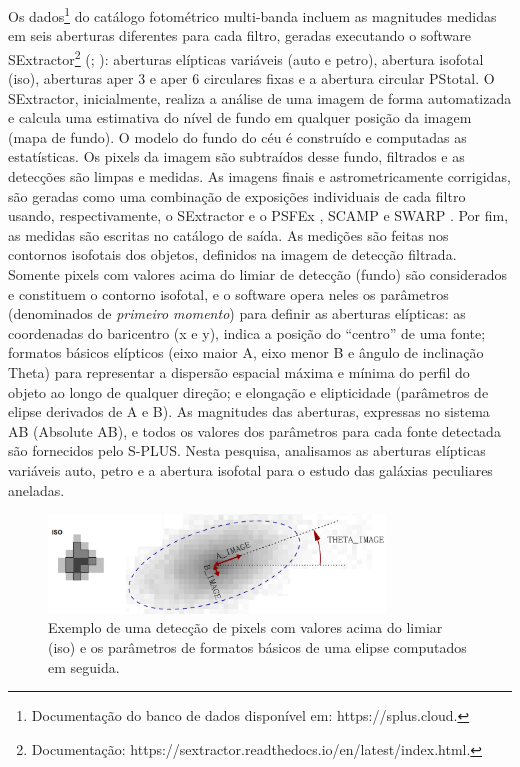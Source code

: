 Os dados\footnote{Documentação do banco de dados disponível em: https://splus.cloud.} do catálogo fotométrico multi-banda incluem as magnitudes medidas em seis aberturas diferentes para cada filtro, geradas executando o software SExtractor\footnote{Documentação: https://sextractor.readthedocs.io/en/latest/index.html.} (; ): aberturas elípticas variáveis (auto e petro), abertura isofotal (iso), aberturas aper 3 e aper 6 circulares fixas e a abertura circular PStotal. O SExtractor, inicialmente, realiza a análise de uma imagem de forma automatizada e calcula uma estimativa do nível de fundo em qualquer posição da imagem (mapa de fundo). O modelo do fundo do céu é construído e computadas as estatísticas. Os pixels da imagem são subtraídos desse fundo, filtrados e as detecções são limpas e medidas. As imagens finais e astrometricamente corrigidas, são geradas como uma combinação de exposições individuais de cada filtro usando, respectivamente, o SExtractor \cite{2010ascl.soft10064B} e o PSFEx \cite{2013ascl.soft01001B}, SCAMP \cite{2010ascl.soft10063B} e SWARP \cite{2010ascl.soft10068B}. Por fim, as medidas são escritas no catálogo de saída. As medições são feitas nos contornos isofotais dos objetos, definidos na imagem de detecção filtrada. Somente pixels com valores acima do limiar de detecção (fundo) são considerados e constituem o contorno isofotal, e o software opera neles os parâmetros (denominados de \emph{primeiro momento}) para definir as aberturas elípticas: as coordenadas do baricentro (x e y), indica a posição do ``centro'' de uma fonte; formatos básicos elípticos (eixo maior A, eixo menor B e ângulo de inclinação Theta) para representar a dispersão espacial máxima e mínima do perfil do objeto ao longo de qualquer direção; e elongação e elipticidade (parâmetros de elipse derivados de A e B). As magnitudes das aberturas, expressas no sistema AB (Absolute AB), e todos os valores dos parâmetros para cada fonte detectada são fornecidos pelo S-PLUS. Nesta pesquisa, analisamos as aberturas elípticas variáveis auto, petro e a abertura isofotal para o estudo das galáxias peculiares aneladas.

\begin{figure}[h]
  \centering 
  \includegraphics[width=0.8\textwidth]{Imagens/iso_elipse.png} 
  \caption[Detecção de uma fonte e parâmetros da elipse.]{Exemplo de uma detecção de pixels com valores acima do limiar (iso) e os parâmetros de formatos básicos de uma elipse computados em seguida.}
  \label{fig:iso_elipse} 
\end{figure}

